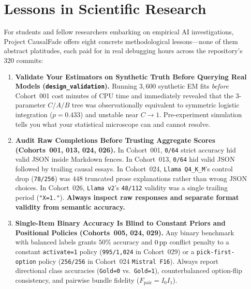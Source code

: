 \chapter{Lessons in Scientific Research}\label{ch:lessons_research}

For students and fellow researchers embarking on empirical AI investigations, Project CausalFade offers eight concrete methodological lessons---none of them abstract platitudes, each paid for in real debugging hours across the repository's 320 commits:

\begin{enumerate}
  \item \textbf{Validate Your Estimators on Synthetic Truth Before Querying Real Models (\texttt{design\_validation}).} Running $3{,}600$ synthetic EM fits \emph{before} Cohort~001 cost minutes of CPU time and immediately revealed that the 3-parameter $C/A/B$ tree was observationally equivalent to symmetric logistic integration ($p=0.433$) and unstable near $C \to 1$. Pre-experiment simulation tells you what your statistical microscope can and cannot resolve.
  \item \textbf{Audit Raw Completions Before Trusting Aggregate Scores (Cohorts~001, 013, 024, 026).} In Cohort~001, \texttt{0/64} strict accuracy hid valid JSON inside Markdown fences. In Cohort~013, \texttt{0/64} hid valid JSON followed by trailing causal essays. In Cohort~024, \texttt{Llama Q4\_K\_M}'s control drop (\texttt{78/256}) was $448$ truncated prose explanations rather than wrong JSON choices. In Cohort~026, \texttt{Llama v2}'s \texttt{48/112} validity was a single trailing period (\texttt{"X=1."}). \textbf{Always inspect raw responses and separate format validity from semantic accuracy.}
  \item \textbf{Single-Item Binary Accuracy Is Blind to Constant Priors and Positional Policies (Cohorts~005, 024, 029).} Any binary benchmark with balanced labels grants $50\%$ accuracy and $0\,\mathrm{pp}$ conflict penalty to a constant \texttt{activate=1} policy (\texttt{995/1,024} in Cohort~029) or a \texttt{pick-first-option} policy (\texttt{256/256} in Cohort~024 \texttt{Mistral F16}). Always report directional class accuracies (\texttt{Gold=0} vs.\ \texttt{Gold=1}), counterbalanced option-flip consistency, and pairwise bundle fidelity ($F_{\mathrm{pair}} = I_0 I_1$).

\end{enumerate}

